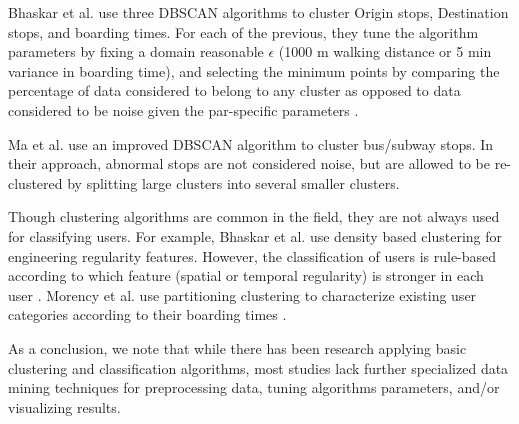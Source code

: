 \documentclass{article}
\begin{document}
Bhaskar et al. use three DBSCAN algorithms to cluster Origin stops, Destination stops, and boarding times. For each of the previous, they tune the algorithm parameters by fixing a domain reasonable $\epsilon$ (1000 m walking distance or 5 min variance in boarding time), and selecting the minimum points by comparing the percentage of data considered to belong to any cluster as opposed to data considered to be noise given the par-specific parameters \cite{bhaskar2015passenger}. 

Ma et al. use an improved DBSCAN algorithm to cluster bus/subway stops. In their approach, abnormal stops are not considered noise, but are allowed to be re-clustered by splitting large clusters into several smaller clusters. 

Though clustering algorithms are common in the field, they are not always used for classifying users. For example, Bhaskar et al. use density based clustering for engineering regularity features. However, the classification of users is rule-based according to which feature (spatial or temporal regularity) is stronger in each user \cite{bhaskar2015passenger}. Morency et al. use partitioning clustering to characterize existing user categories according to their boarding times \cite{morency2007measuring}. 

As a conclusion, we note that while there has been research applying basic clustering and classification algorithms, most studies lack further specialized data mining techniques for preprocessing data, tuning algorithms parameters, and/or visualizing results. 



\end{document}

